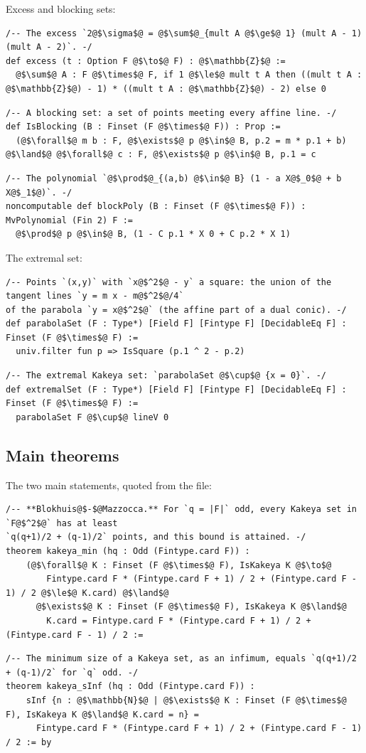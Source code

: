 \documentclass[11pt,a4paper]{article}
\theoremstyle{definition}
\theoremstyle{remark}
\begin{document}
Excess and blocking sets:
\begin{lstlisting}
/-- The excess `2@$\sigma$@ = @$\sum$@_{mult A @$\ge$@ 1} (mult A - 1)(mult A - 2)`. -/
def excess (t : Option F @$\to$@ F) : @$\mathbb{Z}$@ :=
  @$\sum$@ A : F @$\times$@ F, if 1 @$\le$@ mult t A then ((mult t A : @$\mathbb{Z}$@) - 1) * ((mult t A : @$\mathbb{Z}$@) - 2) else 0
\end{lstlisting}
\begin{lstlisting}
/-- A blocking set: a set of points meeting every affine line. -/
def IsBlocking (B : Finset (F @$\times$@ F)) : Prop :=
  (@$\forall$@ m b : F, @$\exists$@ p @$\in$@ B, p.2 = m * p.1 + b) @$\land$@ @$\forall$@ c : F, @$\exists$@ p @$\in$@ B, p.1 = c
\end{lstlisting}
\begin{lstlisting}
/-- The polynomial `@$\prod$@_{(a,b) @$\in$@ B} (1 - a X@$_0$@ + b X@$_1$@)`. -/
noncomputable def blockPoly (B : Finset (F @$\times$@ F)) : MvPolynomial (Fin 2) F :=
  @$\prod$@ p @$\in$@ B, (1 - C p.1 * X 0 + C p.2 * X 1)
\end{lstlisting}

The extremal set:
\begin{lstlisting}
/-- Points `(x,y)` with `x@$^2$@ - y` a square: the union of the tangent lines `y = m x - m@$^2$@/4`
of the parabola `y = x@$^2$@` (the affine part of a dual conic). -/
def parabolaSet (F : Type*) [Field F] [Fintype F] [DecidableEq F] : Finset (F @$\times$@ F) :=
  univ.filter fun p => IsSquare (p.1 ^ 2 - p.2)
\end{lstlisting}
\begin{lstlisting}
/-- The extremal Kakeya set: `parabolaSet @$\cup$@ {x = 0}`. -/
def extremalSet (F : Type*) [Field F] [Fintype F] [DecidableEq F] : Finset (F @$\times$@ F) :=
  parabolaSet F @$\cup$@ lineV 0
\end{lstlisting}

\subsection{Main theorems}

The two main statements, quoted from the file:
\begin{lstlisting}
/-- **Blokhuis@$-$@Mazzocca.** For `q = |F|` odd, every Kakeya set in `F@$^2$@` has at least
`q(q+1)/2 + (q-1)/2` points, and this bound is attained. -/
theorem kakeya_min (hq : Odd (Fintype.card F)) :
    (@$\forall$@ K : Finset (F @$\times$@ F), IsKakeya K @$\to$@
        Fintype.card F * (Fintype.card F + 1) / 2 + (Fintype.card F - 1) / 2 @$\le$@ K.card) @$\land$@
      @$\exists$@ K : Finset (F @$\times$@ F), IsKakeya K @$\land$@
        K.card = Fintype.card F * (Fintype.card F + 1) / 2 + (Fintype.card F - 1) / 2 :=
\end{lstlisting}
\begin{lstlisting}
/-- The minimum size of a Kakeya set, as an infimum, equals `q(q+1)/2 + (q-1)/2` for `q` odd. -/
theorem kakeya_sInf (hq : Odd (Fintype.card F)) :
    sInf {n : @$\mathbb{N}$@ | @$\exists$@ K : Finset (F @$\times$@ F), IsKakeya K @$\land$@ K.card = n} =
      Fintype.card F * (Fintype.card F + 1) / 2 + (Fintype.card F - 1) / 2 := by
\end{lstlisting}
\end{document}
